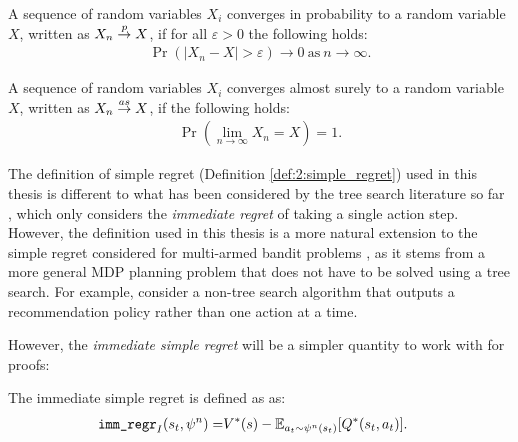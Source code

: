         \begin{defn}
            A sequence of random variables $X_i$ \textnormal{converges in probability} to a random variable $X$, written as $X_n \overset{p}{\to} X$, if for all $\varepsilon>0$ the following holds:
            \begin{align}
                \Pr\left(\left|X_n - X\right| > \varepsilon\right) \rightarrow 0 \ \text{as} \ n \rightarrow \infty.
            \end{align}
        \end{defn}

        \begin{defn}
            A sequence of random variables $X_i$ \textnormal{converges almost surely} to a random variable $X$, written as $X_n \overset{as}{\to} X$, if the following holds:
            \begin{align}
                \Pr\left(\lim_{n\rightarrow\infty} X_n = X\right) = 1.
            \end{align}
        \end{defn}
        





        
        The definition of simple regret (Definition \ref{def:2:simple_regret}) used in this thesis is different to what has been considered by the tree search literature so far , which only considers the \textit{immediate regret} of taking a single action step. However, the definition used in this thesis is a more natural extension to the simple regret considered for multi-armed bandit problems , as it stems from a more general MDP planning problem that does not have to be solved using a tree search. For example, consider a non-tree search algorithm that outputs a recommendation policy rather than one action at a time. 

        However, the \textit{immediate simple regret} will be a simpler quantity to work with for proofs:
        \begin{defn}
            The \textnormal{immediate simple regret} is defined as as:
            \begin{align}
                {\textnormal{\texttt{imm\_regr}}}_I(s_t,\psi^n) =& V^*(s) - \mathbb{E}_{a_t\sim\psi^n(s_t)}[Q^*(s_t,a_t)].
            \end{align}
        \end{defn}

